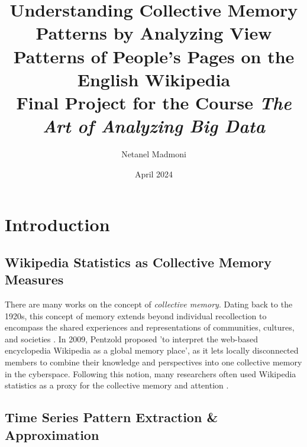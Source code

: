 \documentclass[titlepage]{article}
\title{
Understanding Collective Memory Patterns by Analyzing View Patterns of People’s Pages on the English Wikipedia \\ \vspace{5mm}
\large{Final Project for the Course \textit{The Art of Analyzing Big Data}}}
\author{Netanel Madmoni}
\date{April 2024}
\begin{document}
\maketitle

\section{Introduction}
\subsection{Wikipedia Statistics as Collective Memory Measures}
There are many works on the concept of \textit{collective memory}. Dating back to the 1920s, this concept of memory extends beyond individual recollection to encompass the shared experiences and representations of communities, cultures, and societies \cite{igarashiTwophaseModelCollective2022}. In 2009, Pentzold \cite{pentzoldFixingFloatingGap2009} proposed 'to interpret the web-based encyclopedia Wikipedia as a global memory place', as it lets locally disconnected members to combine their knowledge and perspectives into one collective memory in the cyberspace. Following this notion, many researchers often used Wikipedia statistics as a proxy for the collective memory \cite{yasseriCollectiveMemoryDigital2022} and attention \cite{ruprechterPoorAttentionWealth2023} \cite{gildersleveNewsHistoryIdentifying2023}.

\subsection{Time Series Pattern Extraction \& Approximation}
\end{document}
